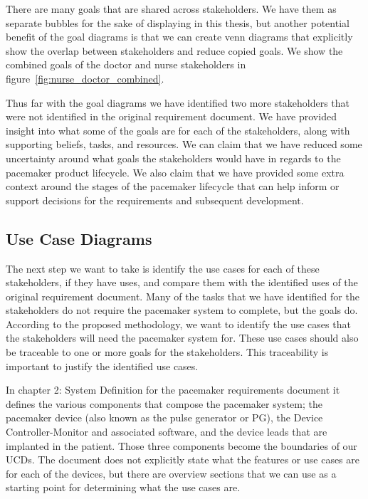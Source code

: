 There are many goals that are shared across stakeholders. We have them as separate bubbles for the sake of displaying in this thesis, but another potential benefit of the goal diagrams is that we can create venn diagrams that explicitly show the overlap between stakeholders and reduce copied goals. We show the combined goals of the doctor and nurse stakeholders in figure~\ref{fig:nurse_doctor_combined}.

Thus far with the goal diagrams we have identified two more stakeholders that were not identified in the original requirement document. We have provided insight into what some of the goals are for each of the stakeholders, along with supporting beliefs, tasks, and resources. We can claim that we have reduced some uncertainty around what goals the stakeholders would have in regards to the pacemaker product lifecycle. We also claim that we have provided some extra context around the stages of the pacemaker lifecycle that can help inform or support decisions for the requirements and subsequent development.

\subsection{Use Case Diagrams}

The next step we want to take is identify the use cases for each of these stakeholders, if they have uses, and compare them with the identified uses of the original requirement document. Many of the tasks that we have identified for the stakeholders do not require the pacemaker system to complete, but the goals do. According to the proposed methodology, we want to identify the use cases that the stakeholders will need the pacemaker system for. These use cases should also be traceable to one or more goals for the stakeholders. This traceability is important to justify the identified use cases.

In chapter 2: System Definition for the pacemaker requirements document it defines the various components that compose the pacemaker system; the pacemaker device (also known as the pulse generator or PG), the Device Controller-Monitor and associated software, and the device leads that are implanted in the patient. Those three components become the boundaries of our UCDs. The document does not explicitly state what the features or use cases are for each of the devices, but there are overview sections that we can use as a starting point for determining what the use cases are.

